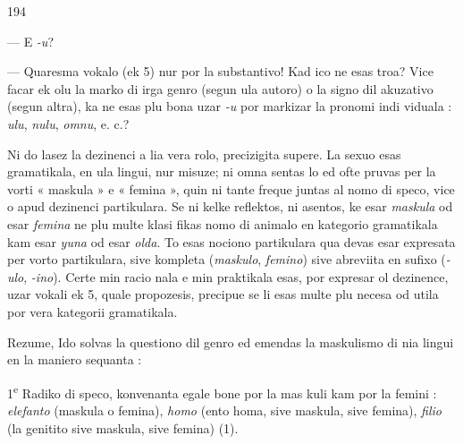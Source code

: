 \begin{VUpage}[198]{194}

--- E \textit{-u}?

--- Quaresma vokalo (ek 5) nur por la substantivo! Kad\nl
ico ne esas troa? Vice facar ek olu la marko di irga genro\nl
(segun ula autoro) o la signo dil akuzativo (segun altra),\nl
ka ne esas plu bona uzar \textit{-u} por markizar la pronomi indi\cc
viduala : \textit{ulu}, \textit{nulu}, \textit{omnu}, e. c.?

Ni do lasez la dezinenci a lia vera rolo, precizigita supere.\nl
La sexuo esas gramatikala, en ula lingui, nur misuze; ni\nl
omna sentas lo ed ofte pruvas per la vorti « maskula » e\nl
« femina », quin ni tante freque juntas al nomo di speco,\nl
vice o apud dezinenci partikulara. Se ni kelke reflektos, ni\nl
asentos, ke esar \textit{maskula} od esar \textit{femina} ne plu multe klasi\cc
fikas nomo di animalo en kategorio gramatikala kam esar\nl
\textit{yuna} od esar \textit{olda}. To esas nociono partikulara qua devas esar\nl
expresata per vorto partikulara, sive kompleta (\textit{maskulo},\nl
\textit{femino}) sive abreviita en sufixo (\textit{-ulo}, \textit{-ino}). Certe min racio\cc
nala e min praktikala esas, por expresar ol dezinence, uzar vokali ek 5, quale propozesis, precipue se li esas multe plu\nl
necesa od utila por vera kategorii gramatikala.

Rezume, Ido solvas la questiono dil genro ed emendas la\nl
maskulismo di nia lingui en la maniero sequanta :

1\textsuperscript{e} Radiko di speco, konvenanta egale bone por la mas\cc
kuli kam por la femini : \textit{elefanto} (maskula o femina), \textit{homo}\nl
(ento homa, sive maskula, sive femina), \textit{filio} (la genitito sive\nl
maskula, sive femina) (1).


\end{VUpage}
